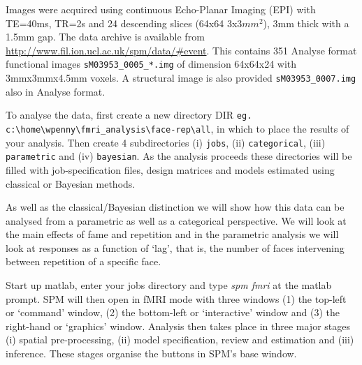 Images were acquired using continuous Echo-Planar Imaging (EPI) with TE=40ms, TR=2s and 24 descending slices (64x64 3x3$mm^2$), 3mm thick with a 1.5mm gap. The data archive is available from \url{http://www.fil.ion.ucl.ac.uk/spm/data/#event}. This contains 351 Analyse format functional images \verb!sM03953_0005_*.img! of dimension 64x64x24 with 3mmx3mmx4.5mm voxels. A structural image is also provided \verb!sM03953_0007.img! also in Analyse format.

To analyse the data, first create a new directory DIR \newline \verb!eg. c:\home\wpenny\fmri_analysis\face-rep\all!, in which to place the results of your analysis. Then create 4 subdirectories (i) \verb!jobs!, (ii)  \verb!categorical!, (iii)  \verb!parametric! and (iv) \verb!bayesian!. As the analysis proceeds these directories will be filled with job-specification files, design matrices and models estimated using classical or Bayesian methods. 

As well as the classical/Bayesian distinction we will show how this data can be analysed from a parametric as well as a categorical perspective. We will look at the main effects of fame and repetition and in the parametric analysis we will look at responses as a function of `lag', that is, the number of faces intervening between repetition of a specific face.

Start up matlab, enter your jobs directory and type {\em spm fmri} at the matlab prompt. SPM will then open in fMRI mode with three windows (1) the top-left or `command' window, (2) the bottom-left or `interactive' window and (3) the right-hand or `graphics' window. Analysis then takes place in three major stages (i) spatial pre-processing, (ii) model specification, review and estimation and (iii) inference. These stages organise the buttons in SPM's base window.

